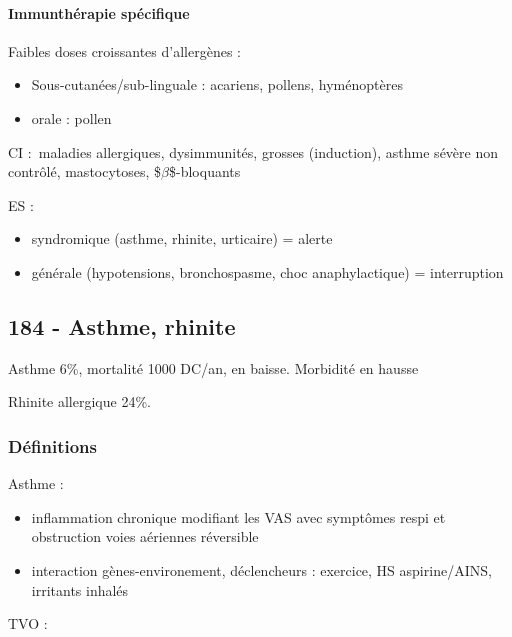 \documentclass[11pt]{article}
\begin{document}
\paragraph{Immunthérapie spécifique}
\label{sec:org8d92318}
Faibles doses croissantes d'allergènes :

\begin{itemize}
\item Sous-cutanées/sub-linguale : acariens, pollens, hyménoptères
\item orale : pollen
\end{itemize}

CI : maladies allergiques, dysimmunités, grosses (induction), asthme sévère non
contrôlé, mastocytoses, \$\(\beta\)\$-bloquants

ES : 

\begin{itemize}
\item syndromique (asthme, rhinite, urticaire) = alerte
\item générale (hypotensions, bronchospasme, choc anaphylactique) =
interruption
\end{itemize}

\subsection{184 \textdagger{} - Asthme, rhinite}
\label{sec:orgdd8389b}
Asthme 6\%, mortalité 1000 DC/an, en baisse. Morbidité en hausse

Rhinite allergique 24\%.
\subsubsection{Définitions}
\label{sec:orgdb90174}
Asthme : 

\begin{itemize}
\item inflammation chronique modifiant les VAS avec symptômes respi et obstruction voies aériennes réversible
\item interaction gènes-environement, déclencheurs : exercice, HS aspirine/AINS,
irritants inhalés
\end{itemize}


TVO : 

\end{document}
